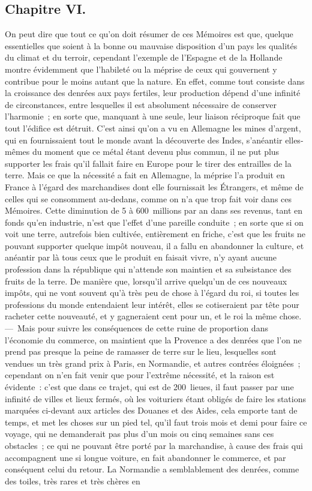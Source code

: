 \documentclass[french,twoside]{book} %
\begin{document}
\subsection[{Chapitre VI.}]{Chapitre VI.}
\noindent On peut dire que tout ce qu’on doit résumer de ces Mémoires est que, quelque essentielles que soient à la bonne ou mauvaise disposition d’un pays les qualités du climat et du terroir, cependant l’exemple de l’Espagne et de la Hollande montre évidemment que l’habileté ou la méprise de ceux qui gouvernent y contribue pour le moins autant que la nature. En effet, comme tout consiste dans la croissance des denrées aux pays fertiles, leur production dépend d’une infinité de circonstances, entre lesquelles il est absolument nécessaire de conserver l’harmonie ; en sorte que, manquant à une seule, leur liaison réciproque fait que tout l’édifice est détruit. C’est ainsi qu’on a vu en Allemagne les mines d’argent, qui en fournissaient tout le monde avant la découverte des Indes, s’anéantir elles-mêmes du moment que ce métal étant devenu plus commun, il ne put plus supporter les frais qu’il fallait faire en Europe pour le tirer des entrailles de la terre. Mais ce que la nécessité a fait en Allemagne, la méprise l’a produit en France à l’égard des marchandises dont elle fournissait les Étrangers, et même de celles qui se consomment au-dedans, comme on n’a que trop fait voir dans ces Mémoires. Cette diminution de 5 à 600 millions par an dans ses revenus, tant en fonds qu’en industrie, n’est que l’effet d’une pareille conduite ; en sorte que si on voit une terre, autrefois bien cultivée, entièrement en friche, c’est que les fruits ne pouvant supporter quelque impôt nouveau, il a fallu en abandonner la culture, et anéantir par là tous ceux que le produit en faisait vivre, n’y ayant aucune profession dans la république qui n’attende son maintien et sa subsistance des fruits de la terre. De manière que, lorsqu’il arrive quelqu’un de ces nouveaux impôts, qui ne vont souvent qu’à très peu de chose à l’égard du roi, si toutes les professions du monde entendaient leur intérêt, elles se cotiseraient par tête pour racheter cette nouveauté, et y gagneraient cent pour un, et le roi la même chose. — Mais pour suivre les conséquences de cette ruine de proportion dans l’économie du commerce, on maintient que la Provence a des denrées que l’on ne prend pas presque la peine de ramasser de terre sur le lieu, lesquelles sont vendues un très grand prix à Paris, en Normandie, et autres contrées éloignées ; cependant on n’en fait venir que pour l’extrême nécessité, et la raison est évidente : c’est que dans ce trajet, qui est de 200 lieues, il faut passer par une infinité de villes et lieux fermés, où les voituriers étant obligés de faire les stations marquées ci-devant aux articles des Douanes et des Aides, cela emporte tant de temps, et met les choses sur un pied tel, qu’il faut trois mois et demi pour faire ce voyage, qui ne demanderait pas plus d’un mois ou cinq semaines sans ces obstacles ; ce qui ne pouvant être porté par la marchandise, à cause des frais qui accompagnent une si longue voiture, en fait abandonner le commerce, et par conséquent celui du retour. La Normandie a semblablement des denrées, comme des toiles, très rares et très chères en 
\end{document}

